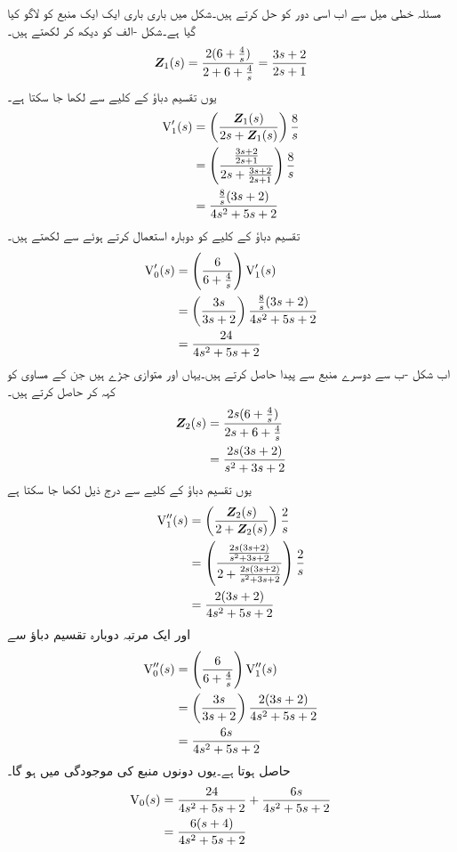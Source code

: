 مسئلہ خطی میل سے اب اسی دور کو حل کرتے ہیں۔شکل  میں باری باری ایک ایک منبع کو لاگو کیا گیا ہے۔شکل -الف کو دیکھ کر  لکھتے ہیں۔
\begin{align*}
{\ensuremath{{\boldsymbol{Z}}}}_1(s)=\frac{2(6+\frac{4}{s})}{2+6+\frac{4}{s}}=\frac{3s+2}{2s+1}
\end{align*}
یوں تقسیم دباؤ کے کلیے سے   لکھا جا سکتا ہے۔
\begin{align*}
{\ensuremath{{\textup{V}}}}'_1(s)&=\left(\frac{{{\boldsymbol{Z}}}_1(s)}{2s+{{\boldsymbol{Z}}}_1(s)}\right)\frac{8}{s}\\
&=\left(\frac{\frac{3s+2}{2s+1}}{2s+\frac{3s+2}{2s+1}}\right)\frac{8}{s}\\
&=\frac{\frac{8}{s}(3s+2)}{4s^2+5s+2}
\end{align*}
تقسیم دباؤ کے کلیے کو دوبارہ استعمال کرتے ہوئے  سے  لکھتے ہیں۔
\begin{align*}
{\ensuremath{{\textup{V}}}}'_0(s)&=\left(\frac{6}{6+\frac{4}{s}}\right){{\textup{V}}}'_1(s)\\
&=\left(\frac{3s}{3s+2}\right)\frac{\frac{8}{s}(3s+2)}{4s^2+5s+2}\\
&=\frac{24}{4s^2+5s+2}
\end{align*}
اب شکل -ب سے دوسرے منبع سے پیدا  حاصل کرتے ہیں۔یہاں  اور  متوازی جڑے ہیں جن کے مساوی کو  کہہ کر حاصل کرتے ہیں۔
\begin{align*}
{\ensuremath{{\boldsymbol{Z}}}}_2(s)&=\frac{2s(6+\frac{4}{s})}{2s+6+\frac{4}{s}}\\
&=\frac{2s(3s+2)}{s^2+3s+2}
\end{align*}
یوں تقسیم دباؤ کے کلیے سے درج ذیل لکھا جا سکتا ہے
\begin{align*}
{\ensuremath{{\textup{V}}}}''_1(s)&=\left(\frac{{{\boldsymbol{Z}}}_2(s)}{2+{{\boldsymbol{Z}}}_2(s)}\right)\frac{2}{s}\\
&=\left(\frac{\frac{2s(3s+2)}{s^2+3s+2}}{2+\frac{2s(3s+2)}{s^2+3s+2}}\right)\frac{2}{s}\\
&=\frac{2(3s+2)}{4s^2+5s+2}
\end{align*}
اور ایک مرتبہ دوبارہ تقسیم دباؤ سے 
\begin{align*}
{\ensuremath{{\textup{V}}}}''_0(s)&=\left(\frac{6}{6+\frac{4}{s}}\right){{\textup{V}}}''_1(s)\\
&=\left(\frac{3s}{3s+2}\right)\frac{2(3s+2)}{4s^2+5s+2}\\
&=\frac{6s}{4s^2+5s+2}
\end{align*}
حاصل ہوتا ہے۔یوں دونوں منبع کی موجودگی میں  ہو گا۔
\begin{align*}
{\ensuremath{{\textup{V}}}}_0(s)&=\frac{24}{4s^2+5s+2}+\frac{6s}{4s^2+5s+2}\\
&=\frac{6(s+4)}{4s^2+5s+2}
\end{align*}

